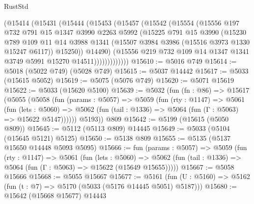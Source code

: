 \begin{lexlean}{RustStd}
\begin{coremodule}
              (@15414
                (@15431
                  (@15444
                    (@15453
                      (@15457
                        (@15542
                          (@15554
                            (@15556
                              @197
                              @732
                              @791
                              @15
                              @1347
                              @3990
                              @2263
                              @5992
                              (@15225
                                @791
                                @15
                                @3990
                                (@15230
                                  @789
                                  @109
                                  @11
                                  @14
                                  @3988
                                  @1341
                                  (@15507 @3984 @3986 (@15516 @3973 @1330 @15247 @6117))
                                  @15250))
                              @14490)
                            (@15556
                              @219
                              @732
                              @109
                              @14
                              @1347
                              @1341
                              @3749
                              @5991
                              @15270
                              @14511)))))))))))))
@15610 := @5016 @749
@15614 := @5018 (@5022 @749) (@5028 @749)
@15615 := @5037 @14442
@15617 := @5033 (@15615 @5052)
@15619 := @5075 (@5076 @749)
@15620 := @5071 @15619
@15622 := @5033 (@15620 @5100)
@15639 := @5032
    (fun (fn : @86) =>
    @15617
      (@5055
        (@5058
          (fun (params : @5057) =>
          @5059
            (fun (rty : @1147) =>
            @5061
              (fun (lets : @5060) =>
              @5062 (fun (tail : @1336) => @5064 (fun (Γ : @5063) => @15622 @5147))))))
        @5193))
    @809
@15642 := @5199 (@15615 (@5050 @809))
@15645 := @5112 (@5113 @809) @14445
@15649 := @5033 (@5104 (@15645 @5121) @5125)
@15650 := @5138 @809
@15655 := @5135 (@5137 @15650 @14448 @5093 @5095)
@15666 := fun (params : @5057) =>
  @5059
    (fun (rty : @1147) =>
    @5061
      (fun (lets : @5060) =>
      @5062 (fun (tail : @1336) => @5064 (fun (Γ : @5063) => @15622 (@15649 @15655)))))
@15667 := @5058 @15666
@15668 := @5055 @15667
@15677 := @5161
    (fun (U : @5160) => @5162 (fun (t : @7) => @5170 (@5033 (@5176 @14445 @5051) @5187)))
@15680 := @15642 (@15668 @15677) @14443

\end{coremodule}
\end{lexlean}
